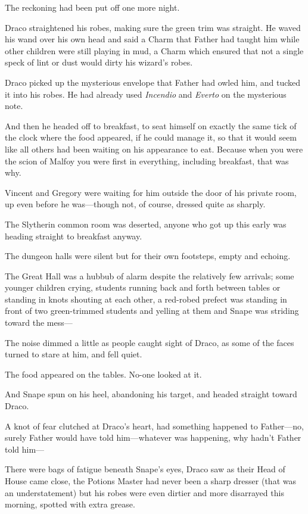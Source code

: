 The reckoning had been put off one more night.


Draco straightened his robes, making sure the green trim was straight. He waved his wand over his own head and said a Charm that Father had taught him while other children were still playing in mud, a Charm which ensured that not a single speck of lint or dust would dirty his wizard’s robes.

Draco picked up the mysterious envelope that Father had owled him, and tucked it into his robes. He had already used \emph{Incendio} and \emph{Everto} on the mysterious note.

And then he headed off to breakfast, to seat himself on exactly the same tick of the clock where the food appeared, if he could manage it, so that it would seem like all others had been waiting on his appearance to eat. Because when you were the scion of Malfoy you were first in everything, including breakfast, that was why.

Vincent and Gregory were waiting for him outside the door of his private room, up even before he was—though not, of course, dressed quite as sharply.

The Slytherin common room was deserted, anyone who got up this early was heading straight to breakfast anyway.

The dungeon halls were silent but for their own footsteps, empty and echoing.

The Great Hall was a hubbub of alarm despite the relatively few arrivals; some younger children crying, students running back and forth between tables or standing in knots shouting at each other, a red-robed prefect was standing in front of two green-trimmed students and yelling at them and Snape was striding toward the mess—

The noise dimmed a little as people caught sight of Draco, as some of the faces turned to stare at him, and fell quiet.

The food appeared on the tables. No-one looked at it.

And Snape spun on his heel, abandoning his target, and headed straight toward Draco.

A knot of fear clutched at Draco’s heart, had something happened to Father—no, surely Father would have told him—whatever was happening, why hadn’t Father told him—

There were bags of fatigue beneath Snape’s eyes, Draco saw as their Head of House came close, the Potions Master had never been a sharp dresser (that was an understatement) but his robes were even dirtier and more disarrayed this morning, spotted with extra grease.

